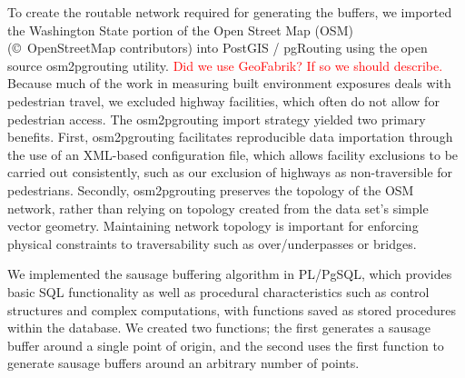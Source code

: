 \documentclass[11pt,letterpaper]{article} %
\begin{document}
To create the routable network required for generating the buffers, we
imported the Washington State portion of the Open Street Map (OSM) (\copyright\ OpenStreetMap contributors)
into PostGIS / pgRouting using the open source osm2pgrouting
utility. \textcolor{red}{Did we use GeoFabrik? If so we should describe.} Because much of the work in measuring built environment exposures deals with pedestrian travel, we
excluded highway facilities, which often do not allow for pedestrian
access. The osm2pgrouting import strategy yielded two primary
benefits. First, osm2pgrouting facilitates reproducible data
importation through the use of an XML-based configuration file, which 
allows facility exclusions to be carried out consistently, such as our exclusion of highways as non-traversible for
pedestrians. Secondly, osm2pgrouting
preserves the topology of the OSM network, rather than relying on
topology created from the data set's simple vector geometry. Maintaining network topology is important for enforcing physical constraints to traversability such as over/underpasses or bridges.


We implemented the sausage buffering algorithm in PL/PgSQL, which provides basic SQL functionality as well as procedural characteristics such as control structures and complex computations, with functions saved as stored procedures within the database. We created two functions; the first generates a
sausage buffer around a single point of origin, and the second uses
the first function to generate sausage buffers around an arbitrary
number of points.
\end{document}
